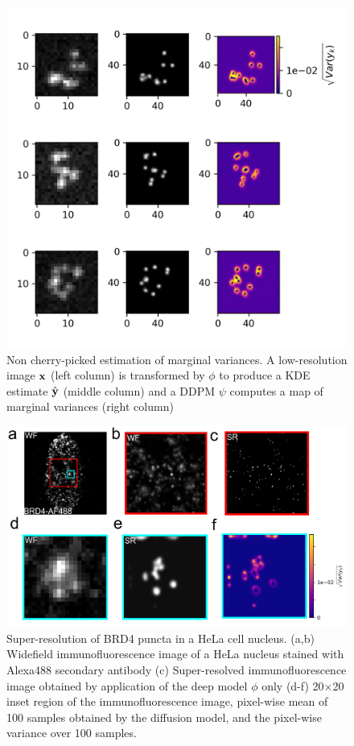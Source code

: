 \documentclass{article}
\begin{document}
\begin{figure}
\centering
\includegraphics[scale=1.1]{media/Bayes.png}
\caption{Non cherry-picked estimation of marginal variances. A low-resolution image $\bold{x}$ (left column) is transformed by $\phi$ to produce a KDE estimate $\hat{\bold{y}}$ (middle column) and a DDPM $\psi$ computes a map of marginal variances (right column)}
\end{figure}

\begin{figure}
\centering
\includegraphics[scale=0.5]{media/BRD4/Deep2.png}
\caption{Super-resolution of BRD4 puncta in a HeLa cell nucleus. (a,b) Widefield immunofluorescence image of a HeLa nucleus stained with Alexa488 secondary antibody (c) Super-resolved immunofluorescence image obtained by application of the deep model $\phi$ only (d-f) 20$\times$20 inset region of the immunofluorescence image, pixel-wise mean of 100 samples obtained by the diffusion model, and the pixel-wise variance over 100 samples.}
\end{figure}
\end{document}

